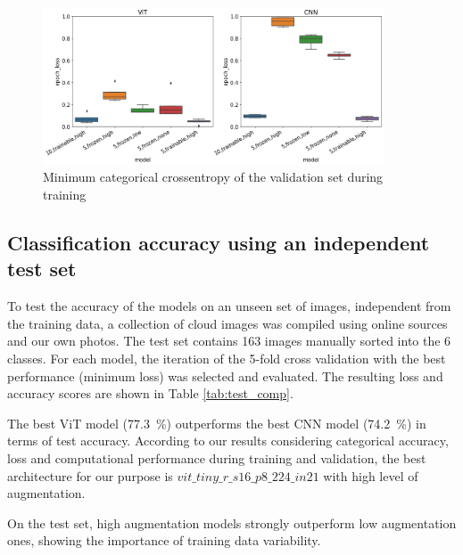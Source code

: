 \documentclass{article}
\begin{document}
\begin{figure}[h]
\includegraphics[width=0.9\textwidth]{loss_comp_validation.png}
\caption{Minimum categorical crossentropy of the validation set during training\label{fig:comp_loss}}
\end{figure}

\subsection{Classification accuracy using an independent test set}\label{sec:test}
To test the accuracy of the models on an unseen set of images, independent from the training data, a collection of cloud images was compiled using online sources and our own photos. The test set contains 163 images manually sorted into the 6 classes. For each model, the iteration of the 5-fold cross validation with the best performance (minimum loss) was selected and evaluated. The resulting loss and accuracy scores are shown in Table \ref{tab:test_comp}.

The best ViT model (\SI{77.3}{\%}) outperforms the best CNN model (\SI{74.2}{\%}) in terms of test accuracy. According to our results considering categorical accuracy, loss and computational performance during training and validation, the best architecture for our purpose is $vit\_tiny\_r\_s16\_p8\_224\_in21$ with high level of augmentation.

On the test set, high augmentation models strongly outperform low augmentation ones, showing the importance of training data variability.
\end{document}
